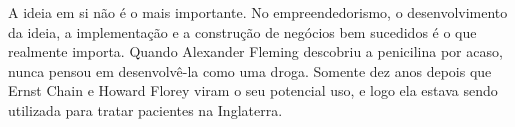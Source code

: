 A ideia em si não é o mais importante.  No empreendedorismo, o 
desenvolvimento da ideia, a implementação e a construção de negócios bem
sucedidos é o que realmente importa.  Quando Alexander Fleming descobriu
a penicilina por acaso, nunca pensou em desenvolvê-la como uma droga.
Somente dez anos depois que Ernst Chain e Howard Florey viram o
seu potencial uso, e logo ela estava sendo utilizada para tratar pacientes
na Inglaterra.
